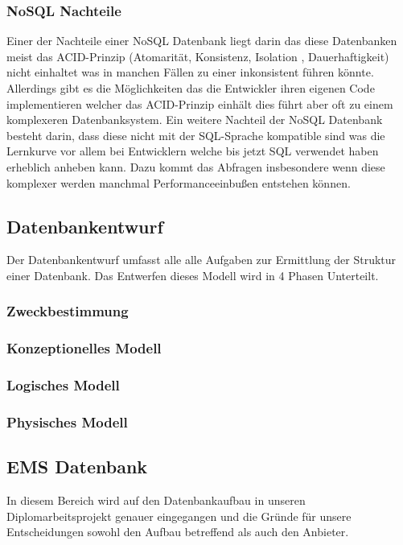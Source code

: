 	\subsubsection{NoSQL Nachteile}
		Einer der Nachteile einer NoSQL Datenbank liegt darin das diese Datenbanken meist das ACID-Prinzip (Atomarität, Konsistenz, Isolation , Dauerhaftigkeit) nicht einhaltet was in manchen Fällen zu einer inkonsistent führen könnte. Allerdings gibt es die Möglichkeiten das die Entwickler ihren eigenen Code implementieren welcher das ACID-Prinzip einhält dies führt aber oft zu einem komplexeren Datenbanksystem. Ein weitere Nachteil der NoSQL Datenbank besteht darin, dass diese nicht mit der SQL-Sprache kompatible sind was die Lernkurve vor allem bei Entwicklern welche bis jetzt SQL verwendet haben erheblich anheben kann. Dazu kommt das Abfragen insbesondere wenn diese komplexer werden manchmal Performanceeinbußen entstehen können.
		

	\subsection{Datenbankentwurf}
		Der Datenbankentwurf umfasst alle alle Aufgaben zur Ermittlung der Struktur einer Datenbank. Das Entwerfen dieses Modell wird in 4 Phasen Unterteilt.
		
		\subsubsection*{Zweckbestimmung}

		\subsubsection*{Konzeptionelles Modell}

		\subsubsection*{Logisches Modell}

		\subsubsection*{Physisches Modell}


	\subsection{EMS Datenbank}
		In diesem Bereich wird auf den Datenbankaufbau in unseren Diplomarbeitsprojekt genauer eingegangen und die Gründe für unsere Entscheidungen sowohl den Aufbau betreffend als auch den Anbieter.
		

